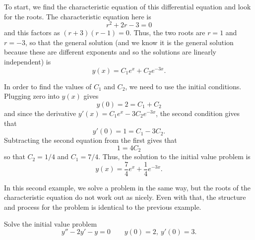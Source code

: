 \documentclass{ximera}
\begin{document}
\begin{exampleSol}
    To start, we find the characteristic equation of this differential equation and look for the roots. The characteristic equation here is 
    \begin{equation*}
        r^2 + 2r - 3 = 0
    \end{equation*}
    and this factors as $(r+3)(r-1) = 0$. Thus, the two roots are $r=1$ and $r=-3$, so that the general solution (and we know it is the general solution because these are different exponents and so the solutions are linearly independent) is
    \begin{equation*}
        y(x) = C_1e^{x} + C_2e^{-3x}.
    \end{equation*}
    
    In order to find the values of $C_1$ and $C_2$, we need to use the initial conditions. Plugging zero into $y(x)$ gives
    \begin{equation*}
        y(0) = 2 = C_1 + C_2
    \end{equation*}
    and since the derivative $y'(x) = C_1e^x - 3C_2e^{-3x}$, the second condition gives that
    \begin{equation*}
        y'(0) = 1 = C_1 - 3C_2.
    \end{equation*}
    Subtracting the second equation from the first gives that
    \begin{equation*}
        1 = 4C_2
    \end{equation*}
    so that $C_2 = 1/4$ and $C_1 = 7/4$. Thus, the solution to the initial value problem is
    \begin{equation*}
        y(x) = \frac{7}{4}e^x + \frac{1}{4}e^{-3x}.
    \end{equation*}
\end{exampleSol}

In this second example, we solve a problem in the same way, but the roots of the characteristic equation do not work out as nicely. Even with that, the structure and process for the problem is identical to the previous example.

\begin{example}
    Solve the initial value problem 
    \begin{equation*}
        y'' - 2y' - y = 0 \qquad y(0) = 2,\ y'(0) = 3.
    \end{equation*}
\end{example}
\end{document}
